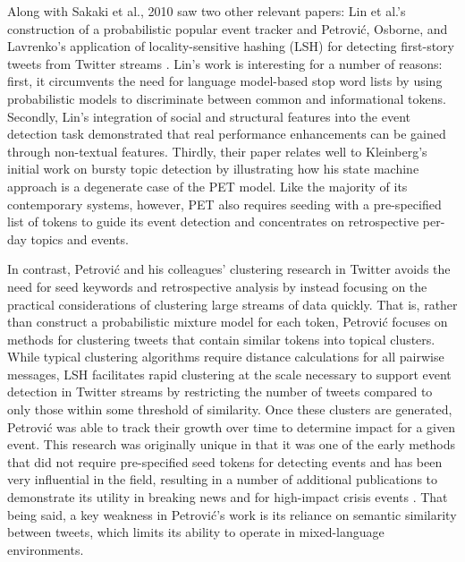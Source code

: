 \documentclass{sig-alternate}
\begin{document}
Along with Sakaki et al., 2010 saw two other relevant papers: Lin et al.'s construction of a probabilistic popular event tracker \cite{Lin:2010:PSM:1835804.1835922} and Petrovi\'{c}, Osborne, and Lavrenko's application of locality-sensitive hashing (LSH) for detecting first-story tweets from Twitter streams \cite{Petrovic:2010:SFS:1857999.1858020}.
Lin's work is interesting for a number of reasons: first, it circumvents the need for language model-based stop word lists by using probabilistic models to discriminate between common and informational tokens.
Secondly, Lin's integration of social and structural features into the event detection task demonstrated that real performance enhancements can be gained through non-textual features.
Thirdly, their paper relates well to Kleinberg's initial work on bursty topic detection by illustrating how his state machine approach is a degenerate case of the PET model.
Like the majority of its contemporary systems, however, PET also requires seeding with a pre-specified list of tokens to guide its event detection and concentrates on retrospective per-day topics and events.

In contrast, Petrovi\'{c} and his colleagues' clustering research in Twitter avoids the need for seed keywords and retrospective analysis by instead focusing on the practical considerations of clustering large streams of data quickly.
That is, rather than construct a probabilistic mixture model for each token, Petrovi\'{c} focuses on methods for clustering tweets that contain similar tokens into topical clusters.
While typical clustering algorithms require distance calculations for all pairwise messages, LSH facilitates rapid clustering at the scale necessary to support event detection in Twitter streams by restricting the number of tweets compared to only those within some threshold of similarity.
Once these clusters are generated, Petrovi\'{c} was able to track their growth over time to determine impact for a given event.
This research was originally unique in that it was one of the early methods that did not require pre-specified seed tokens for detecting events and has been very influential in the field, resulting in a number of additional publications to demonstrate its utility in breaking news and for high-impact crisis events \cite{osborne2014real,petrovic2013can,6601695}.
That being said, a key weakness in Petrovi\'{c}'s work is its reliance on semantic similarity between tweets, which limits its ability to operate in mixed-language environments.
\end{document}
